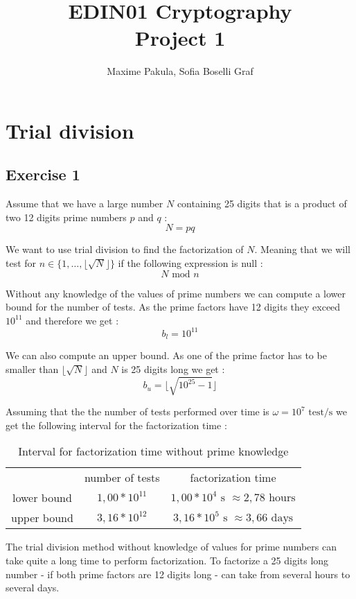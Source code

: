 \documentclass{article}
\title{EDIN01 Cryptography \\ Project 1}
\author{Maxime Pakula, Sofia Boselli Graf}
\begin{document}
\maketitle

\tableofcontents

\newpage


\section{Trial division}

\subsection{Exercise 1}

Assume that we have a large number $N$ containing 25 digits that is a product of two 12 digits prime numbers $p$ and $q$ :
$$N = pq$$

We want to use trial division to find the factorization of $N$. Meaning that we will test for $n \in \{1,\dotsc,\lfloor\sqrt{N}\rfloor\}$ if the following expression is null :
$$N \text{ mod } n$$

Without any knowledge of the values of prime numbers we can compute a lower bound for the number of tests. As the prime factors have 12 digits they exceed $10^{11}$ and therefore we get :
$$b_l = 10^{11}$$

We can also compute an upper bound. As one of the prime factor has to be smaller than $\lfloor\sqrt{N}\rfloor$ and $N$ is 25 digits long we get :
$$b_u = \lfloor\sqrt{10^{25}-1}\rfloor$$

Assuming that the the number of tests performed over time is $\omega = 10^7 \text{ test/s}$ we get the following interval for the factorization time :

\begin{table}[H]
    \centering
    \begin{tabular}{c|c|c}
         & number of tests & factorization time \\
        lower bound & $1,00*10^{11}$ & $1,00*10^{4} \text{ s } \approx 2,78 \text{ hours}$ \\
        upper bound & $ 3,16*10^{12}$ & $3,16*10^{5} \text{ s } \approx 3,66 \text{ days}$
    \end{tabular}
    \caption{Interval for factorization time without prime knowledge}
\end{table}

The trial division method without knowledge of values for prime numbers can take quite a long time to perform factorization. To factorize a 25 digits long number - if both prime factors are 12 digits long - can take from several hours to several days.
\end{document}
